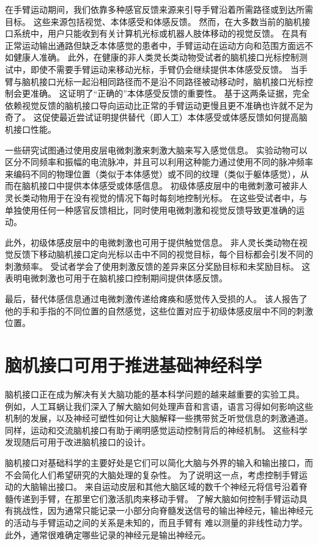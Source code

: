 在手臂运动期间，我们依靠多种感官反馈来源来引导手臂沿着所需路径或到达所需目标。
这些来源包括视觉、本体感受和体感反馈。
然而，在大多数当前的脑机接口系统中，用户只能收到有关计算机光标或机器人肢体移动的视觉反馈。
在具有正常运动输出通路但缺乏本体感觉的患者中，手臂运动在运动方向和范围方面远不如健康人准确。
此外，在健康的非人类灵长类动物受试者的脑机接口光标控制测试中，即使不需要手臂运动来移动光标，手臂仍会继续提供本体感受反馈。
当手臂与脑机接口光标一起沿相同路径而不是沿不同路径被动移动时，脑机接口光标控制会更准确。
这证明了“正确的”本体感受反馈的重要性。
基于这两条证据，完全依赖视觉反馈的脑机接口导向运动比正常的手臂运动更慢且更不准确也许就不足为奇了。
这促使最近尝试证明提供替代（即人工）本体感受或体感反馈如何提高脑机接口性能。


一些研究试图通过使用皮层电微刺激来刺激大脑来写入感觉信息。
实验动物可以区分不同频率和振幅的电流脉冲，并且可以利用这种能力通过使用不同的脉冲频率来编码不同的物理位置（类似于本体感觉）或不同的纹理（类似于躯体感觉），从而在脑机接口中提供本体感受或体感信息。
初级体感皮层中的电微刺激可被非人灵长类动物用于在没有视觉的情况下每时每刻地控制光标。
在这些受试者中，与单独使用任何一种感官反馈相比，同时使用电微刺激和视觉反馈导致更准确的运动。


此外，初级体感皮层中的电微刺激也可用于提供触觉信息。
非人灵长类动物在视觉反馈下移动脑机接口定向光标以击中不同的视觉目标，每个目标都会引发不同的刺激频率。 
受试者学会了使用刺激反馈的差异来区分奖励目标和未奖励目标。
这表明电微刺激也可用于在脑机接口控制期间提供体感反馈。


最后，替代体感信息通过电微刺激传递给瘫痪和感觉传入受损的人。
该人报告了他的手和手指的不同位置的自然感觉，这些位置对应于初级体感皮层中不同的刺激位置。



\section{脑机接口可用于推进基础神经科学}

脑机接口正在成为解决有关大脑功能的基本科学问题的越来越重要的实验工具。
例如，人工耳蜗让我们深入了解大脑如何处理声音和言语，语言习得如何影响这些机制的发展，以及神经可塑性如何让大脑解释一些携带贫乏听觉信息的刺激通道。
同样，运动和交流脑机接口有助于阐明感觉运动控制背后的神经机制。
这些科学发现随后可用于改进脑机接口的设计。


脑机接口对基础科学的主要好处是它们可以简化大脑与外界的输入和输出接口，而不会简化人们希望研究的大脑处理的复杂性。
为了说明这一点，考虑控制手臂运动的大脑输出接口。
来自运动皮层和其他大脑区域的数千个神经元将信号沿着脊髓传递到手臂，在那里它们激活肌肉来移动手臂。
了解大脑如何控制手臂运动具有挑战性，因为通常只能记录一小部分向脊髓发送信号的输出神经元，输出神经元的活动与手臂运动之间的关系是未知的，而且手臂有 难以测量的非线性动力学。
此外，通常很难确定哪些记录的神经元是输出神经元。


